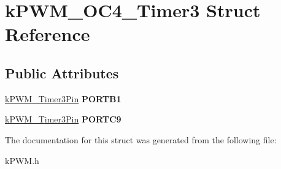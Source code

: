 \hypertarget{structkPWM__OC4__Timer3}{}\section{k\+P\+W\+M\+\_\+\+O\+C4\+\_\+\+Timer3 Struct Reference}
\label{structkPWM__OC4__Timer3}
\subsection*{Public Attributes}
\begin{DoxyCompactItemize}
\item 
\hyperlink{structkPWM__Timer3Pin}{k\+P\+W\+M\+\_\+\+Timer3\+Pin} {\bfseries P\+O\+R\+T\+B1}\hypertarget{structkPWM__OC4__Timer3_a53604d92f808755187ad498dd9c5b79e}{}\label{structkPWM__OC4__Timer3_a53604d92f808755187ad498dd9c5b79e}

\item 
\hyperlink{structkPWM__Timer3Pin}{k\+P\+W\+M\+\_\+\+Timer3\+Pin} {\bfseries P\+O\+R\+T\+C9}\hypertarget{structkPWM__OC4__Timer3_ace367036f62946381818851053b7d4c1}{}\label{structkPWM__OC4__Timer3_ace367036f62946381818851053b7d4c1}

\end{DoxyCompactItemize}


The documentation for this struct was generated from the following file\+:\begin{DoxyCompactItemize}
\item 
k\+P\+W\+M.\+h\end{DoxyCompactItemize}
